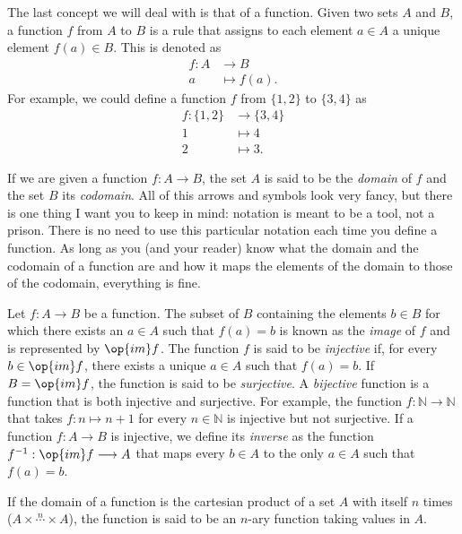 \begin{para}[Functions]
The last concept we will deal with is that of a function. Given two sets $A$ and $B$, a function $f$ from $A$ to $B$ is a rule that assigns to each element $a\in A$ a unique element $f(a)\in B$. This is denoted as
\begin{align*}
f : A & \longrightarrow B \\
a & \longmapsto f(a).
\end{align*}
For example, we could define a function $f$ from $\{1,2\}$ to $\{3,4\}$ as
\begin{align*}
f: \{1,2\} &\longrightarrow \{3,4\} \\
1 &\longmapsto 4\\
2 &\longmapsto 3.
\end{align*}

If we are given a function $f:A\longrightarrow B$, the set $A$ is said to be the \emph{domain} of $f$ and the set $B$ its \emph{codomain}.
All of this arrows and symbols look very fancy, but there is one thing I want you to keep in mind: notation is meant to be a tool, not a prison.
There is no need to use this particular notation each time you define a function. As long as you (and your reader) know what the domain and the codomain of a function are and how it maps the elements of the domain to those of the codomain, everything is fine. 

Let $f:A\longrightarrow B$ be a function. The subset of $B$ containing the elements $b\in B$ for which there exists an $a\in A$ such that $f(a) = b$ is known as the \emph{image} of $f$ and is represented by $\op{im} f$. The function $f$ is said to be \emph{injective} if, for every $b\in \op{im} f$, there exists a unique $a\in A$ such that $f(a) = b$. If $B = \op{im} f$, the function is said to be \emph{surjective}. A \emph{bijective} function is a function that is both injective and surjective.
For example, the function $f:\mathbb{N}\longrightarrow\mathbb{N}$ that takes $f:n\longmapsto n+1$ for every $n\in\mathbb{N}$ is injective but not surjective.
If a function $f:A\longrightarrow B$ is injective, we define its \emph{inverse} as the function $f^{-1} : \op{im} f \longrightarrow A$ that maps every $b\in A$ to the only $a\in A$ such that $f(a) = b$.

If the domain of a function is the cartesian product of a set $A$ with itself $n$ times ($A\times \overset{n}{\cdots} \times A$), the function is said to be an $n$-ary function taking values in $A$.
\end{para}

